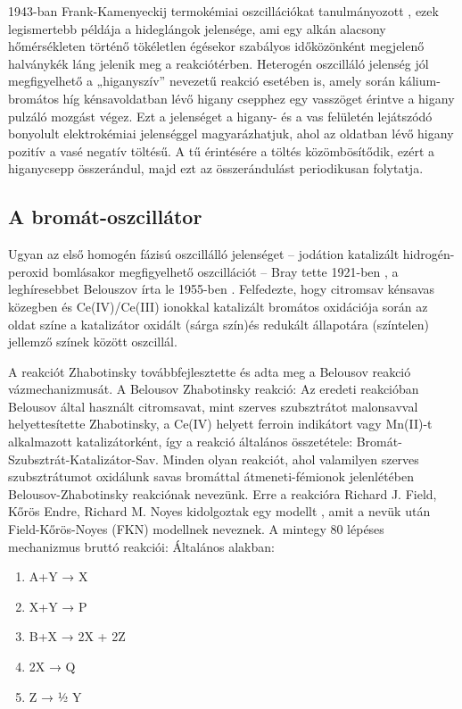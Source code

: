 1943-ban Frank-Kamenyeckij termokémiai oszcillációkat tanulmányozott \cite{frank1943nikov}, ezek legismertebb példája a hideglángok jelensége, ami egy alkán alacsony hőmérsékleten történő tökéletlen égésekor szabályos időközönként megjelenő halványkék láng jelenik meg a reakciótérben.
Heterogén oszcilláló jelenség jól megfigyelhető a „higanyszív” nevezetű reakció esetében is, amely során kálium-bromátos híg kénsavoldatban lévő higany csepphez egy vasszöget érintve a higany pulzáló mozgást végez. Ezt a jelenséget a higany- és a vas felületén lejátszódó bonyolult elektrokémiai jelenséggel magyarázhatjuk, ahol az oldatban lévő higany pozitív a vasé negatív töltésű. A tű érintésére a töltés közömbösítődik, ezért a higanycsepp összerándul, majd ezt az összerándulást periodikusan folytatja.

\subsection{A bromát-oszcillátor} \label{bromatoszcillator}
Ugyan az első homogén fázisú oszcillálló jelenséget -- jodátion katalizált hidrogén-peroxid bomlásakor megfigyelhető oszcillációt -- Bray tette 1921-ben \cite{bray1921periodic}, a leghíresebbet Belouszov írta le 1955-ben \cite{belousov1959collection}. Felfedezte, hogy citromsav kénsavas közegben és Ce(IV)/Ce(III) ionokkal katalizált bromátos oxidációja során az oldat színe a katalizátor oxidált (sárga szín)és redukált állapotára (színtelen) jellemző színek között oszcillál.

A reakciót Zhabotinsky továbbfejlesztette és adta meg a Belousov reakció vázmechanizmusát. A Belousov Zhabotinsky \cite{zhabotinsky1964periodical} reakció:
Az eredeti reakcióban Belousov által használt citromsavat, mint szerves szubsztrátot malonsavval helyettesítette Zhabotinsky, a Ce(IV) helyett ferroin indikátort vagy Mn(II)-t alkalmazott katalizátorként, így a reakció általános összetétele: Bromát-Szubsztrát-Katalizátor-Sav.
Minden olyan reakciót, ahol valamilyen szerves szubsztrátumot oxidálunk savas bromáttal átmeneti-fémionok jelenlétében Belousov-Zhabotinsky reakciónak nevezünk. Erre a reakcióra Richard J. Field, Kőrös Endre, Richard M. Noyes kidolgoztak egy modellt \cite{noyes1972oscillations}, amit a nevük után Field-Kőrös-Noyes (FKN) modellnek neveznek. A mintegy 80 lépéses mechanizmus bruttó reakciói:
Általános alakban:

\begin{enumerate}
\item A+Y → X
\item X+Y → P
\item B+X → 2X + 2Z
\item 2X → Q
\item Z → ½ Y
\end{enumerate}

